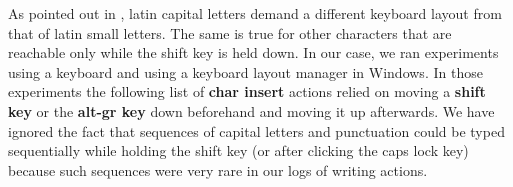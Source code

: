 \documentclass[output=paper]{LSP/langsci}
\begin{document}
As pointed out in , latin capital letters demand a different keyboard layout from that of latin small letters. The same is true for other characters that are reachable only while the shift key is held down. In our case, we ran experiments using a  keyboard and using a  keyboard layout manager in Windows. In those experiments the following list of \textbf{char insert} actions relied on moving a \textbf{shift key} or the  \textbf{alt-gr key} down beforehand and moving it up afterwards. We have ignored the fact that sequences of capital letters and punctuation could be typed sequentially while holding the shift key (or after clicking the caps lock key) because such sequences were very rare in our logs of writing actions.

\end{document}
